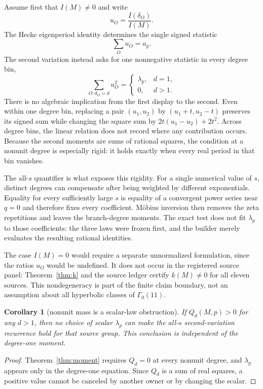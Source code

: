 \documentclass[11pt]{article}
\newtheorem{corollary}[theorem]{Corollary}
\theoremstyle{definition}
\theoremstyle{remark}
\newcommand{\G}{\Gamma_0(11)}
\begin{document}
Assume first that $I(M)\neq0$ and write
\[
u_O=\frac{I(\delta_O)}{I(M)}.
\]
The Hecke eigenperiod identity determines the single signed statistic
\[
\sum_Ou_O=a_p.
\]
The second variation instead asks for one nonnegative statistic in every degree bin,
\[
\sum_{O:d_O=d}u_O^2=
\begin{cases}
\lambda_p,&d=1,\\
0,&d>1.
\end{cases}
\]
There is no algebraic implication from the first display to the second. Even within one degree bin, replacing a pair $(u_1,u_2)$ by $(u_1+t,u_2-t)$ preserves its signed sum while changing the square sum by $2t(u_1-u_2)+2t^2$. Across degree bins, the linear relation does not record where any contribution occurs. Because the second moments are sums of rational squares, the condition at a nonunit degree is especially rigid: it holds exactly when every real period in that bin vanishes.

The all-$s$ quantifier is what exposes this rigidity. For a single numerical value of $s$, distinct degrees can compensate after being weighted by different exponentials. Equality for every sufficiently large $s$ is equality of a convergent power series near $q=0$ and therefore fixes every coefficient. M\"obius inversion then removes the zeta repetitions and leaves the branch-degree moments. The exact test does not fit $\lambda_p$ to those coefficients: the three laws were frozen first, and the builder merely evaluates the resulting rational identities.

The case $I(M)=0$ would require a separate unnormalized formulation, since the ratios $u_O$ would be undefined. It does not occur in the registered source panel: Theorem~\ref{thm:k} and the source ledger certify $k(M)\neq0$ for all eleven sources. This nondegeneracy is part of the finite claim boundary, not an assumption about all hyperbolic classes of $\G$.

\begin{corollary}[nonunit mass is a scalar-law obstruction]\label{cor:nonunit}
If $Q_d(M,p)>0$ for any $d>1$, then no choice of scalar $\lambda_p$ can make the all-$s$ second-variation recurrence hold for that source group. This conclusion is independent of the degree-one moment.
\end{corollary}

\begin{proof}
Theorem~\ref{thm:moment} requires $Q_d=0$ at every nonunit degree, and $\lambda_p$ appears only in the degree-one equation. Since $Q_d$ is a sum of real squares, a positive value cannot be canceled by another owner or by changing the scalar.
\end{proof}
\end{document}

